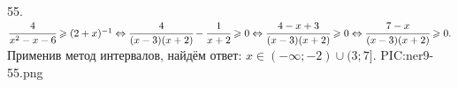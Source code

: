 55. $\cfrac{4}{x^2-x-6}\geqslant(2+x)^{-1}\Leftrightarrow\cfrac{4}{(x-3)(x+2)}-\cfrac{1}{x+2}\geqslant0\Leftrightarrow\cfrac{4-x+3}{(x-3)(x+2)}\geqslant0
\Leftrightarrow\cfrac{7-x}{(x-3)(x+2)}\geqslant0.$ Применив метод интервалов, найдём ответ: $x\in(-\infty;-2)\cup(3;7].$
{{PIC:ner9-55.png}}\\
